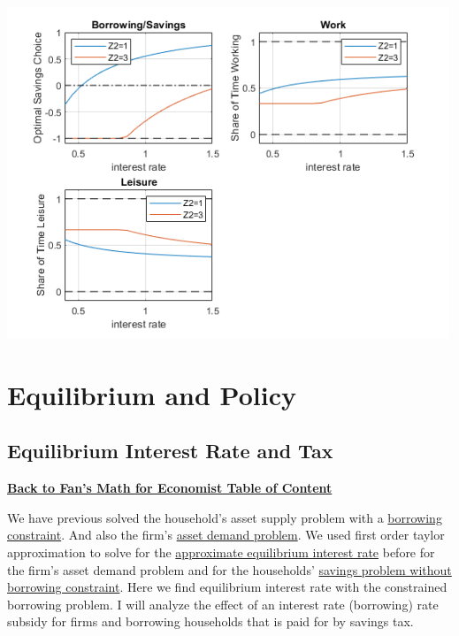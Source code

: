 \documentclass[
]{book}
\begin{document}
\includegraphics[width=5.20833in,height=\textheight]{img/household_asset_labor_constrained_images/figure_1.png}

\hypertarget{equilibrium-and-policy}{%
\chapter{Equilibrium and Policy}\label{equilibrium-and-policy}}

\hypertarget{equilibrium-interest-rate-and-tax}{%
\section{Equilibrium Interest Rate and Tax}\label{equilibrium-interest-rate-and-tax}}

\href{https://fanwangecon.github.io/Math4Econ/}{\textbf{Back to Fan's Math for Economist Table of
Content}}

We have previous solved the household's asset supply problem with a
\href{https://fanwangecon.github.io/Math4Econ/optimization_application/household_borrow_constrained.html}{borrowing
constraint}.
And also the firm's \href{https://fanwangecon.github.io/Math4Econ/derivative_application/K_borrow_firm.html}{asset demand
problem}.
We used first order taylor approximation to solve for the \href{https://fanwangecon.github.io/Math4Econ/matrix_application/demand_supply_taylor_approximate_capital.html}{approximate
equilibrium interest
rate}
before for the firm's asset demand problem and for the households'
\href{https://fanwangecon.github.io/Math4Econ/derivative_application/K_save_households.html}{savings problem without borrowing
constraint}.
Here we find equilibrium interest rate with the constrained borrowing
problem. I will analyze the effect of an interest rate (borrowing) rate
subsidy for firms and borrowing households that is paid for by savings
tax.
\end{document}
